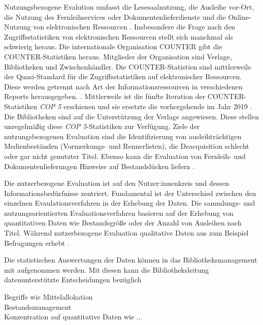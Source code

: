 Nutzungsbezogene Evalution umfasst die Lesesaalnutzung, die Ausleihe vor-Ort, die Nutzung des Fernleihservices oder Dokumentenlieferdienste und die Online-Nutzung von elektronischen Ressourcen
\cite[vgl.][254 ff.]{johannsen_jochen_bestands-_2015}.
Insbesondere die Frage nach den Zugriffsstatistiken von elektronischen Ressourcen stellt sich manchmal als schwierig heraus.
Die internationale Organisation \acrfull{COUNTER} gibt die COUNTER-Statistiken heraus. Mitglieder der Organisation sind Verlage, Bibliotheken
und Zwischenhändler. Die COUNTER-Statistien sind mittlerweile der Quasi-Standard für die Zugriffsstatistiken 
auf elektronischer Ressourcen.  Diese werden getrennt nach Art der Informationsressourcen in verschiedenen Reports herausgegeben. \cite[vgl.][260 ff.]{johannsen_jochen_bestands-_2015}.
Mittlerweile ist die fünfte Iteration der COUNTER-Statistiken \textit{\acrshort{COP 5}} erschienen und 
sie ersetzte die vorhergehende im Jahr 2019 \cite[vgl.][]{counter_abstract_2020}. 
Die Bibliotheken sind auf die Unterstützung der Verlage angewiesen. Diese stellen unregelmäßig diese \textit{\acrshort{COP 5}}-Statistiken zur Verfügung.
Ziele der nutzungsbezogenen Evaluation sind die Identifizierung von ausleihträchtigen Medienbeständen (Vormerkungs- und Rennerlisten), 
die Deacquisition schlecht oder gar nicht genutzter Titel. Ebenso kann die Evaluation von Fernleih- und Dokumentenlieferungen Hinweise auf Bestandslücken liefern
\cite[vgl.][255 ff.]{johannsen_jochen_bestands-_2015}.

Die nutzerbezogene Evaluation ist auf den Nutzer:innenkreis und dessen Informationsbedürfnisse zentriert.
Fundamental ist der Unterschied zwischen den einzelnen Evaulationsverfahren in der Erhebung der Daten. 
Die sammlungs- und nutzungsorientierten Evaluationsverfahren basieren auf der Erhebung von quantitativen Daten wie Bestandsgröße oder der Anzahl von Ausleihen nach Titel. 
Während nutzerbezogene Evaluation qualitative Daten aus zum Beispiel Befragungen erhebt \cite[vgl.][461 ff.]{blake_data_2004}.

Die statistischen Auswertungen der Daten können in das Bibliotheksmanagement mit aufgenommen werden.  
Mit diesen kann die Bibliotheksleitung datenunterstützte Entscheidungen bezüglich



\clearpage
Begriffe wie Mittelallokation\\
Bestandsmanagement\\
Konzentration auf quantitative Daten wie ...\\

